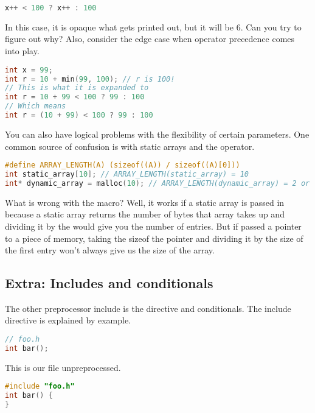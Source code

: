 \begin{lstlisting}[language=C]
  x++ < 100 ? x++ : 100
\end{lstlisting}

In this case, it is opaque what gets printed out, but it will be 6.
Can you try to figure out why?
Also, consider the edge case when \gls{operator precedence} comes into play.

\begin{lstlisting}[language=C]
int x = 99;
int r = 10 + min(99, 100); // r is 100!
// This is what it is expanded to
int r = 10 + 99 < 100 ? 99 : 100
// Which means
int r = (10 + 99) < 100 ? 99 : 100
\end{lstlisting}

You can also have logical problems with the flexibility of certain parameters.
One common source of confusion is with static arrays and the  operator.

\begin{lstlisting}[language=C]
#define ARRAY_LENGTH(A) (sizeof((A)) / sizeof((A)[0]))
int static_array[10]; // ARRAY_LENGTH(static_array) = 10
int* dynamic_array = malloc(10); // ARRAY_LENGTH(dynamic_array) = 2 or 1 consistently
\end{lstlisting}

What is wrong with the macro?
Well, it works if a \gls{static array} is passed in because  a static array returns the number of bytes that array takes up and dividing it by the  would give you the number of entries.
But if passed a pointer to a piece of memory, taking the sizeof the pointer and dividing it by the size of the first entry won't always give us the size of the array.

\subsection{Extra: Includes and conditionals}

The other preprocessor include is the  directive and conditionals.
The include directive is explained by example.

\begin{lstlisting}[language=C]
// foo.h
int bar();
\end{lstlisting}

This is our file  unpreprocessed.

\begin{lstlisting}[language=C]
#include "foo.h"
int bar() {
}
\end{lstlisting}

